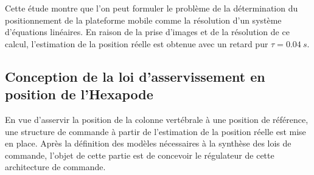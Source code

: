 \ifprof
\begin{corrige}
\end{corrige}
\else
\fi

Cette étude montre que l’on peut formuler le problème de la détermination du positionnement de la plateforme
mobile comme la résolution d’un système d’équations linéaires. En raison de la prise d’images et de la résolution
de ce calcul, l’estimation de la position réelle est obtenue avec un retard pur $\tau = \SI{0,04}{s}$.

\subsection{Conception de la loi d'asservissement en position de l'Hexapode}
\begin{obj}
En vue d’asservir la position de la colonne vertébrale à une position de référence, une structure de
commande à partir de l’estimation de la position réelle est mise en place. Après la définition des
modèles nécessaires à la synthèse des lois de commande, l’objet de cette partie est de concevoir le
régulateur de cette architecture de commande.
\end{obj}


